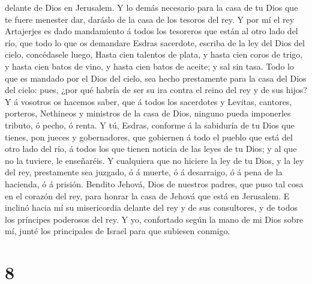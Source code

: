 delante de Dios en Jerusalem.  Y lo demás necesario para la
casa de tu Dios que te fuere menester dar, daráslo de la casa de los
tesoros del rey.  Y por mí el rey Artajerjes es dado
mandamiento á todos los tesoreros que están al otro lado del río, que
todo lo que os demandare Esdras sacerdote, escriba de la ley del Dios
del cielo, concédasele luego,  Hasta cien talentos de
plata, y hasta cien coros de trigo, y hasta cien batos de vino, y hasta
cien batos de aceite; y sal sin tasa.  Todo lo que es
mandado por el Dios del cielo, sea hecho prestamente para la casa del
Dios del cielo: pues, ¿por qué habría de ser su ira contra el reino del
rey y de sus hijos?  Y á vosotros os hacemos saber, que á
todos los sacerdotes y Levitas, cantores, porteros, Nethineos y
ministros de la casa de Dios, ninguno pueda imponerles tributo, ó pecho,
ó renta.  Y tú, Esdras, conforme á la sabiduría de tu Dios
que tienes, pon jueces y gobernadores, que gobiernen á todo el pueblo
que está del otro lado del río, á todos los que tienen noticia de las
leyes de tu Dios; y al que no la tuviere, le enseñaréis.  Y
cualquiera que no hiciere la ley de tu Dios, y la ley del rey,
prestamente sea juzgado, ó á muerte, ó á desarraigo, ó á pena de la
hacienda, ó á prisión.  Bendito Jehová, Dios de nuestros
padres, que puso tal cosa en el corazón del rey, para honrar la casa de
Jehová que está en Jerusalem.  E inclinó hacia mí su
misericordia delante del rey y de sus consultores, y de todos los
príncipes poderosos del rey. Y yo, confortado según la mano de mi Dios
sobre mí, junté los principales de Israel para que subiesen conmigo.

\hypertarget{section-7}{%
\section{8}\label{section-7}}

